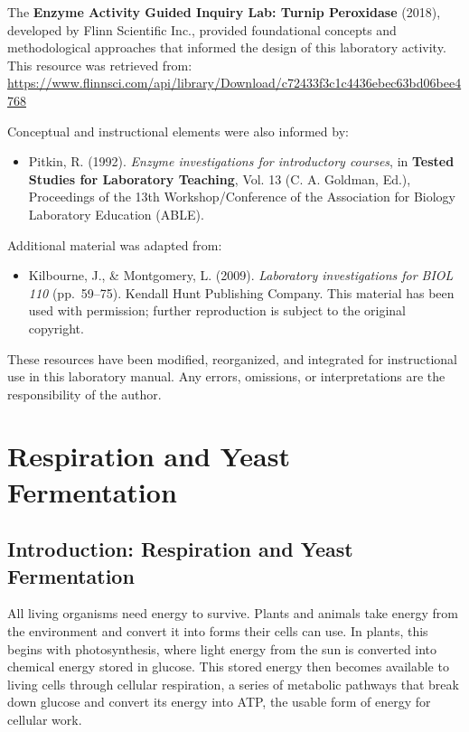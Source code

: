 \documentclass[
  letterpaper,
  DIV=11,
  numbers=noendperiod]{scrreprt}
\providecommand{\tightlist}{%
  \setlength{\itemsep}{0pt}\setlength{\parskip}{0pt}}
\begin{document}
The \textbf{Enzyme Activity Guided Inquiry Lab: Turnip Peroxidase}
(2018), developed by Flinn Scientific Inc., provided foundational
concepts and methodological approaches that informed the design of this
laboratory activity. This resource was retrieved from:
\url{https://www.flinnsci.com/api/library/Download/c72433f3c1c4436ebec63bd06bee4768}

Conceptual and instructional elements were also informed by:

\begin{itemize}
\tightlist
\item
  Pitkin, R. (1992). \emph{Enzyme investigations for introductory
  courses}, in \textbf{Tested Studies for Laboratory Teaching}, Vol. 13
  (C. A. Goldman, Ed.), Proceedings of the 13th Workshop/Conference of
  the Association for Biology Laboratory Education (ABLE).
\end{itemize}

Additional material was adapted from:

\begin{itemize}
\tightlist
\item
  Kilbourne, J., \& Montgomery, L. (2009). \emph{Laboratory
  investigations for BIOL 110} (pp.~59--75). Kendall Hunt Publishing
  Company. This material has been used with permission; further
  reproduction is subject to the original copyright.
\end{itemize}

These resources have been modified, reorganized, and integrated for
instructional use in this laboratory manual. Any errors, omissions, or
interpretations are the responsibility of the author.


\chapter{\texorpdfstring{\textbf{Respiration and Yeast
Fermentation}}{Respiration and Yeast Fermentation}}\label{respiration-and-yeast-fermentation}

\section{\texorpdfstring{\textbf{Introduction: Respiration and Yeast
Fermentation}}{Introduction: Respiration and Yeast Fermentation}}\label{introduction-respiration-and-yeast-fermentation}

All living organisms need energy to survive. Plants and animals take
energy from the environment and convert it into forms their cells can
use. In plants, this begins with photosynthesis, where light energy from
the sun is converted into chemical energy stored in glucose. This stored
energy then becomes available to living cells through cellular
respiration, a series of metabolic pathways that break down glucose and
convert its energy into ATP, the usable form of energy for cellular
work.
\end{document}
